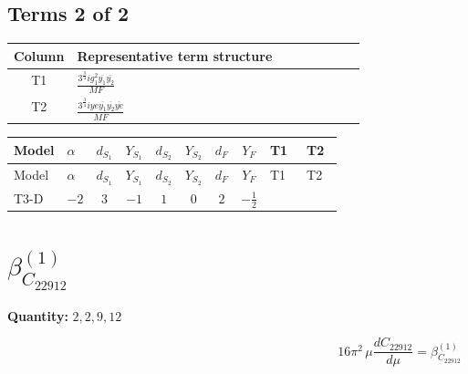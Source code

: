 \documentclass[8pt]{article}
\begin{document}
\begin{landscape}
\subsection*{Terms 2 of 2}
\begin{center}
\begin{tabular}{@{}c >{\raggedright\arraybackslash}p{0.82\linewidth}@{}}
\toprule
Column & Representative term structure \\
\midrule
T1 & \(\displaystyle \frac{3^{\frac{3}{4}} i g_{1}^{2} \overline{y_{1}} \overline{y_{2}}}{MF}\) \\
\midrule
T2 & \(\displaystyle \frac{3^{\frac{3}{4}} i ye \overline{y_{1}} \overline{y_{2}} \overline{ye}}{MF}\) \\
\midrule
\bottomrule
\end{tabular}
\end{center}
\smallskip
\tiny
\begin{longtable}{@{}llcccccc >{\raggedright\arraybackslash}p{0.21\linewidth} >{\raggedright\arraybackslash}p{0.21\linewidth}@{}}
\toprule
Model & $\alpha$ & $d_{S_1}$ & $Y_{S_1}$ & $d_{S_2}$ & $Y_{S_2}$ & $d_F$ & $Y_F$ & T1 & T2 \\
\midrule
\endfirsthead
\toprule
Model & $\alpha$ & $d_{S_1}$ & $Y_{S_1}$ & $d_{S_2}$ & $Y_{S_2}$ & $d_F$ & $Y_F$ & T1 & T2 \\
\midrule
\endhead
T3-D & $-2$ & $3$ & $-1$ & $1$ & $0$ & $2$ & $-\frac{1}{2}$ & \scriptsize\adjustbox{max width=\linewidth}{$\begin{gathered} - \frac{3^{\frac{3}{4}} i g_{1}^{2} \overline{y_{1}} \overline{y_{2}}}{8 MF}\end{gathered}$} & \scriptsize\adjustbox{max width=\linewidth}{$\begin{gathered} \frac{3^{\frac{3}{4}} i ye \overline{y_{1}} \overline{y_{2}} \overline{ye}}{12 MF}\end{gathered}$} \\
\midrule
\bottomrule
\end{longtable}
\clearpage
\section*{$\beta_{C_{22912}}^{(1)}$}
\noindent\textbf{Quantity: }$\mathrm{2,2,9,12}$\par\smallskip
\[16\pi^2\,\mu\frac{d C_{22912}}{d\mu}=\beta_{C_{22912}}^{(1)}\]

\end{landscape}
\end{document}
